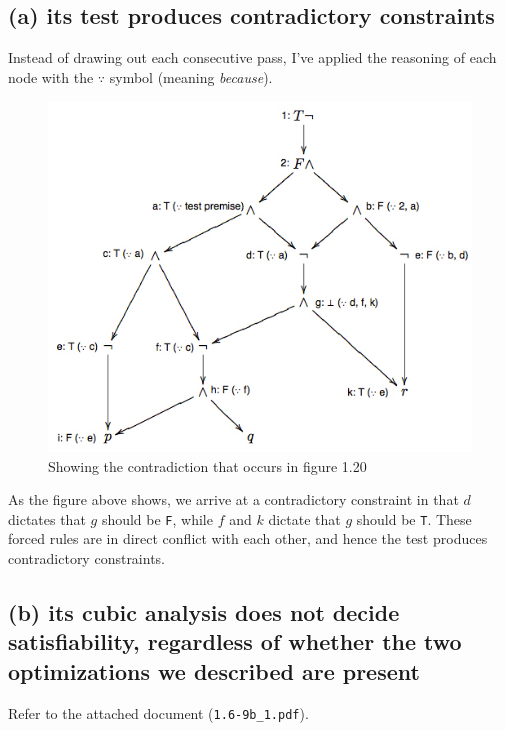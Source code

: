 \documentclass[11pt,a4paper]{article}
\begin{document}
\subsection*{(a) \mdseries its test produces contradictory constraints}
Instead of drawing out each consecutive pass, I've applied the reasoning of each node with the $\because$ symbol (meaning {\it because}).
\begin{figure}[H]
	\center
	\includegraphics[scale=0.75]{contradiction-tree}
	\caption{Showing the contradiction that occurs in figure 1.20}
\end{figure}
As the figure above shows, we arrive at a contradictory constraint in that $d$ dictates that $g$ should be {\tt F}, while $f$ and $k$ dictate that $g$ should be {\tt T}. These forced rules are in direct conflict with each other, and hence the test produces contradictory constraints.

\subsection*{(b) \mdseries its cubic analysis does not decide satisfiability, regardless of whether the two optimizations we described are present}
Refer to the attached document ({\tt 1.6-9b\_1.pdf}).

\newpage
\end{document}
